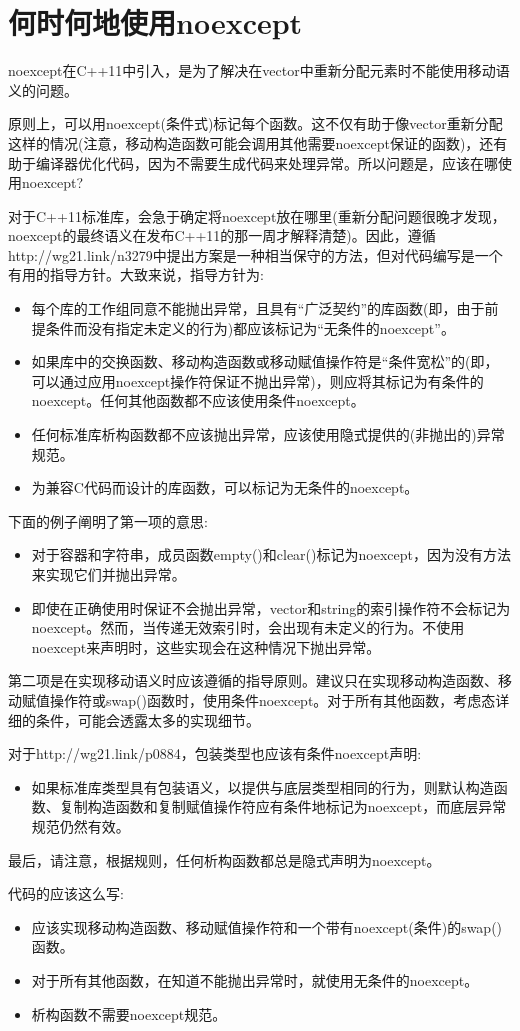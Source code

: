 \section{何时何地使用noexcept}
noexcept在C++11中引入，是为了解决在vector中重新分配元素时不能使用移动语义的问题。

原则上，可以用noexcept(条件式)标记每个函数。这不仅有助于像vector重新分配这样的情况(注意，移动构造函数可能会调用其他需要noexcept保证的函数)，还有助于编译器优化代码，因为不需要生成代码来处理异常。所以问题是，应该在哪使用noexcept?

对于C++11标准库，会急于确定将noexcept放在哪里(重新分配问题很晚才发现，noexcept的最终语义在发布C++11的那一周才解释清楚)。因此，遵循http://wg21.link/n3279中提出方案是一种相当保守的方法，但对代码编写是一个有用的指导方针。大致来说，指导方针为:

\begin{itemize}
	\item 每个库的工作组同意不能抛出异常，且具有“广泛契约”的库函数(即，由于前提条件而没有指定未定义的行为)都应该标记为“无条件的noexcept”。
	\item 如果库中的交换函数、移动构造函数或移动赋值操作符是“条件宽松”的(即，可以通过应用noexcept操作符保证不抛出异常)，则应将其标记为有条件的noexcept。任何其他函数都不应该使用条件noexcept。
	\item 任何标准库析构函数都不应该抛出异常，应该使用隐式提供的(非抛出的)异常规范。
	\item 为兼容C代码而设计的库函数，可以标记为无条件的noexcept。
\end{itemize}

下面的例子阐明了第一项的意思:

\begin{itemize}
	\item 对于容器和字符串，成员函数empty()和clear()标记为noexcept，因为没有方法来实现它们并抛出异常。
	\item 即使在正确使用时保证不会抛出异常，vector和string的索引操作符不会标记为noexcept。然而，当传递无效索引时，会出现有未定义的行为。不使用noexcept来声明时，这些实现会在这种情况下抛出异常。
\end{itemize}

第二项是在实现移动语义时应该遵循的指导原则。建议只在实现移动构造函数、移动赋值操作符或swap()函数时，使用条件noexcept。对于所有其他函数，考虑态详细的条件，可能会透露太多的实现细节。

对于http://wg21.link/p0884，包装类型也应该有条件noexcept声明:

\begin{itemize}
	\item 如果标准库类型具有包装语义，以提供与底层类型相同的行为，则默认构造函数、复制构造函数和复制赋值操作符应有条件地标记为noexcept，而底层异常规范仍然有效。
\end{itemize}

最后，请注意，根据规则，任何析构函数都总是隐式声明为noexcept。

代码的应该这么写:

\begin{itemize}
	\item 应该实现移动构造函数、移动赋值操作符和一个带有noexcept(条件)的swap()函数。
	\item 对于所有其他函数，在知道不能抛出异常时，就使用无条件的noexcept。
	\item 析构函数不需要noexcept规范。
\end{itemize}







